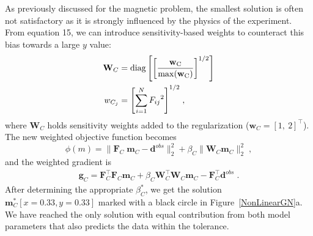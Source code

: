\documentclass[paper]{geophysics}
\begin{document}
As previously discussed for the magnetic problem, the smallest solution is often not satisfactory as it is strongly influenced by the physics of the experiment.
From equation 15, we can introduce sensitivity-based weights to counteract this bias towards a large $y$ value:
\begin{equation}
\begin{split}
\mathbf{W}_C &= \rm{diag} \left[ {\left[\frac{\mathbf{ w}_C}{\rm{max}(\mathbf{ w}_C)}\right]}^{1/2}\right]\\
w_{C_j} &= {\left[\sum_{i=1}^{N}{F_{ij}}^2 \right]}^{1/2}\;,
\end{split}
\end{equation}
where $\mathbf{W}_C$ holds sensitivity weights added to the regularization ($\mathbf{w}_C=[1,\:2]^\top$).
The new weighted objective function becomes
\begin{equation}\label{toyProblem}
\phi(m) = \| \mathbf{F}_C\;\mathbf{m}_C - \mathbf{d}^{obs} \|_2^2 + \beta_C \| \mathbf{W}_C \mathbf{m}_C \|_2^2 \;,
\end{equation}
and the weighted gradient is
\begin{equation}\label{gradLinearWeighted}
\begin{split}
\mathbf{g}_C = \mathbf{F}_C^\top\mathbf{F}_C \mathbf{m}_C + \beta_C \mathbf{W}_C^\top\mathbf{W}_C\mathbf{m}_C - \mathbf{F}_C^\top \mathbf{d}^{obs}\;.
\end{split}
\end{equation}
After determining the appropriate $\beta_C^*$, we get the solution $\mathbf{m}^*_C[x=0.33, y=0.33]$ marked with a black circle in Figure~\ref{NonLinearGN}a. We have reached the only solution with equal contribution from both model parameters that also predicts the data within the tolerance.
\end{document}
